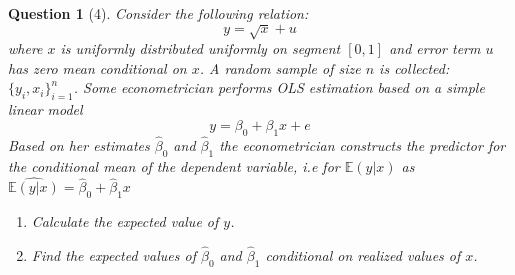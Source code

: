 \documentclass[12pt,reqno]{amsart}
\theoremstyle{plain}
\newcommand{\E}{\mathbb{E}}
\newtheorem*{theorem*}{Question}
\begin{document}
\begin{theorem*}[4]
    \normalfont
    Consider the following relation:
    \[y = \sqrt{x} + u\]
    where $ x $ is uniformly distributed uniformly on segment $ [0, 1] $ and error term $ u $ has zero
    mean conditional on $ x $. A random sample of size $ n $ is collected: $ \{ y_i, x_i\}_{i=1}^{n} $.
    Some econometrician performs OLS estimation based on a simple linear model
    \[ y = \beta_0 + \beta_1x+ e\]
    Based on her estimates $ \hat{\beta}_0 $ and $ \hat{\beta}_1 $ the econometrician constructs the
    predictor for the conditional mean of the dependent variable, i.e for $ \E(y|x) $ as
    $ \hat{\E (y|x)} = \hat\beta_0 + \hat\beta_1x $
    \begin{enumerate}
        \item Calculate the expected value of $ y $.
        \item Find the expected values of $ \hat{\beta}_{0} $ and $ \hat{\beta}_{1} $ conditional
              on realized values of $ x $.
    \end{enumerate}
\end{theorem*}
\end{document}
